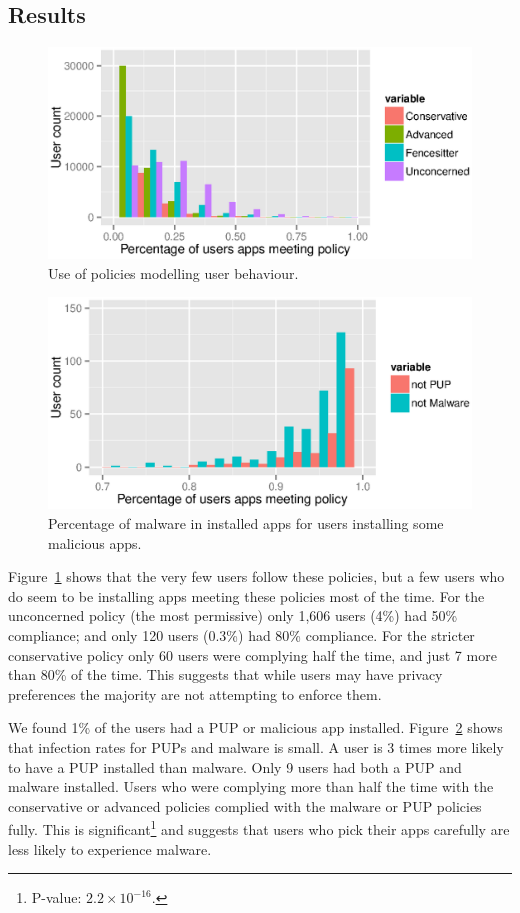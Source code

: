 \documentclass[]{soups-poster}
\begin{document}
\subsection{Results}

\begin{figure}[!ht]\centering
  \includegraphics[width=0.90\linewidth]{./tables/lin.eps}
  \caption{Use of policies modelling user behaviour.}
  \label{fig:lin}
\end{figure}

\begin{figure}[!ht]\centering
  \includegraphics[width=0.85\linewidth]{./tables/malware.eps}
  \caption{Percentage of malware in installed apps for users installing some malicious apps.}
  \label{fig:malware}
\end{figure}

Figure~\ref{fig:lin} shows that the very few users follow these policies,
but a few users who do seem to be installing apps meeting these policies most of the time.
For the unconcerned policy (the most permissive) only 1,606 users (4\%) had 50\% compliance;
  and only 120 users (0.3\%) had 80\% compliance.
For the stricter conservative policy only 60 users were complying half the time, and just 7 more than 80\% of the time.
This suggests that while users may have privacy preferences the majority are not attempting to enforce them.

We found 1\% of the users had a PUP or malicious app installed.
Figure~\ref{fig:malware} shows that infection rates for PUPs and malware is small.
A user is 3 times more likely to have a PUP installed than malware.
Only 9 users had both a PUP and malware installed.
Users who were complying more than half the time with the conservative or advanced policies complied with the malware or PUP policies fully.
This is significant\footnote{P-value: $2.2\times10^{-16}$.} and suggests that users who pick their apps carefully are less likely to experience malware.
\end{document}
